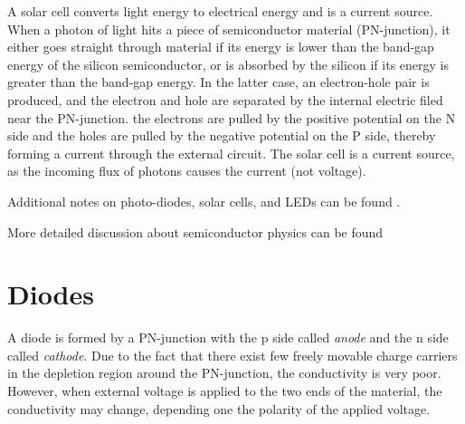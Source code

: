 \documentclass{article}
\begin{document}
\begin{itemize}
A solar cell converts light energy to electrical energy and is a current 
source. When a photon of light hits a piece of semiconductor material 
(PN-junction), it either goes straight through material if its energy is 
lower than the band-gap energy of the silicon semiconductor, or is absorbed
by the silicon if its energy is greater than the band-gap energy. In the
latter case, an electron-hole pair is produced, and the electron and hole
are separated by the internal electric filed near the PN-junction. the 
electrons are pulled by the positive potential on the N side and the 
holes are pulled by the negative potential on the P side, thereby forming
a current through the external circuit. The solar cell is a current source,
as the incoming flux of photons causes the current (not voltage).


\end{itemize}

Additional notes on photo-diodes, solar cells, and LEDs can be found
.

More detailed discussion about semiconductor physics can be found

\section*{Diodes}

A diode is formed by a PN-junction with the p side called {\em anode} and the
n side called {\em cathode}. Due to the fact that there exist few freely movable 
charge carriers in the depletion region around the PN-junction, the conductivity
is very poor. However, when external voltage is applied to the two ends of the 
material, the conductivity may change, depending one the polarity of the applied
voltage.

\end{document}
